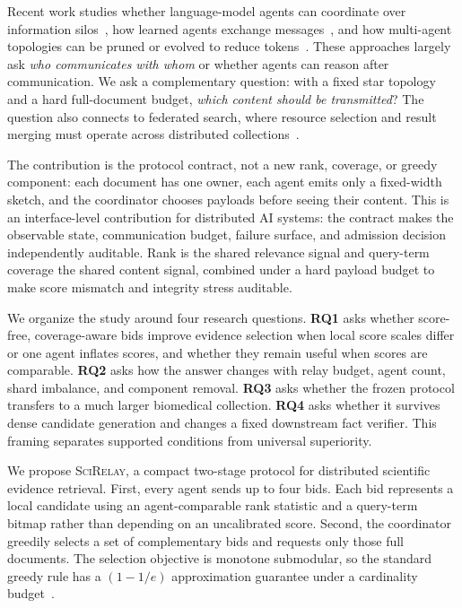 \documentclass[sigconf]{acmart}
\newcommand{\method}{\textsc{SciRelay}}
\begin{document}
Recent work studies whether language-model agents can coordinate over information silos~\cite{zhang2026silobench}, how learned agents exchange messages~\cite{foerster2016communicate,das2019tarmac}, and how multi-agent topologies can be pruned or evolved to reduce tokens~\cite{wang2025agentdropout,tian2026queenbee}. These approaches largely ask \emph{who communicates with whom} or whether agents can reason after communication. We ask a complementary question: with a fixed star topology and a hard full-document budget, \emph{which content should be transmitted}? The question also connects to federated search, where resource selection and result merging must operate across distributed collections~\cite{shokouhi2011federated}.

The contribution is the protocol contract, not a new rank, coverage, or greedy component: each document has one owner, each agent emits only a fixed-width sketch, and the coordinator chooses payloads before seeing their content. This is an interface-level contribution for distributed AI systems: the contract makes the observable state, communication budget, failure surface, and admission decision independently auditable. Rank is the shared relevance signal and query-term coverage the shared content signal, combined under a hard payload budget to make score mismatch and integrity stress auditable.

We organize the study around four research questions. \textbf{RQ1} asks whether score-free, coverage-aware bids improve evidence selection when local score scales differ or one agent inflates scores, and whether they remain useful when scores are comparable. \textbf{RQ2} asks how the answer changes with relay budget, agent count, shard imbalance, and component removal. \textbf{RQ3} asks whether the frozen protocol transfers to a much larger biomedical collection. \textbf{RQ4} asks whether it survives dense candidate generation and changes a fixed downstream fact verifier. This framing separates supported conditions from universal superiority.

We propose \method, a compact two-stage protocol for distributed scientific evidence retrieval. First, every agent sends up to four bids. Each bid represents a local candidate using an agent-comparable rank statistic and a query-term bitmap rather than depending on an uncalibrated score. Second, the coordinator greedily selects a set of complementary bids and requests only those full documents. The selection objective is monotone submodular, so the standard greedy rule has a $(1-1/e)$ approximation guarantee under a cardinality budget~\cite{nemhauser1978submodular}.
\end{document}
